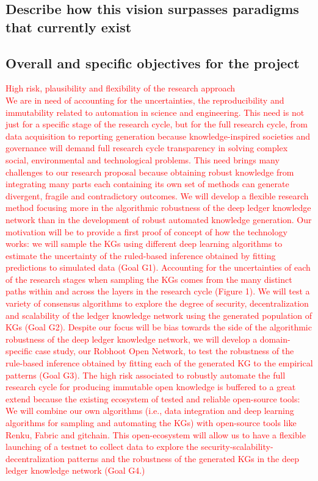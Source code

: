 \documentclass[12pt, a4paper]{article} %
\begin{document}
\subsection{Describe how this vision surpasses paradigms that
  currently exist}


\subsection{Overall and specific objectives for the project}
\textcolor{red}{High risk, plausibility and flexibility of the
  research approach\\ We are in need of accounting for the
  uncertainties, the reproducibility and immutability related to
  automation in science and engineering. This need is not just for a
  specific stage of the research cycle, but for the full research
  cycle, from data acquisition to reporting generation because
  knowledge-inspired societies and governance will demand full
  research cycle transparency in solving complex social, environmental
  and technological problems. This need brings many challenges to our
  research proposal because obtaining robust knowledge from
  integrating many parts each containing its own set of methods can
  generate divergent, fragile and contradictory outcomes. We will
  develop a flexible research method focusing more in the algorithmic
  robustness of the deep ledger knowledge network than in the
  development of robust automated knowledge generation. Our motivation
  will be to provide a first proof of concept of how the technology
  works: we will sample the KGs using different deep learning
  algorithms to estimate the uncertainty of the ruled-based inference
  obtained by fitting predictions to simulated data (Goal
  G1). Accounting for the uncertainties of each of the research stages
  when sampling the KGs comes from the many distinct paths within and
  across the layers in the research cycle (Figure 1). We will test a
  variety of consensus algorithms to explore the degree of security,
  decentralization and scalability of the ledger knowledge network
  using the generated population of KGs (Goal G2). Despite our focus
  will be bias towards the side of the algorithmic robustness of the
  deep ledger knowledge network, we will develop a domain-specific
  case study, our Robhoot Open Network, to test the robustness of the
  rule-based inference obtained by fitting each of the generated KG to
  the empirical patterns (Goal G3). The high risk associated to
  robustly automate the full research cycle for producing immutable
  open knowledge is buffered to a great extend because the existing
  ecosystem of tested and reliable open-source tools: We will combine
  our own algorithms (i.e., data integration and deep learning
  algorithms for sampling and automating the KGs) with open-source
  tools like Renku, Fabric and gitchain. This open-ecosystem will
  allow us to have a flexible launching of a testnet to collect data
  to explore the security-scalability-decentralization patterns and
  the robustness of the generated KGs in the deep ledger knowledge
  network (Goal G4.) }
\end{document}
